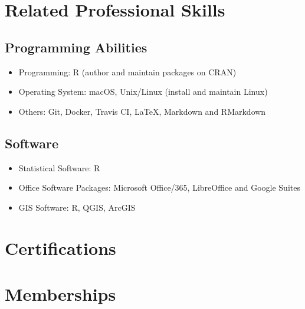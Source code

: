 \documentclass[11pt, a4paper]{awesome-cv}
\providecommand{\tightlist}{%
	\setlength{\itemsep}{0pt}\setlength{\parskip}{0pt}}
\begin{document}
\hypertarget{related-professional-skills}{%
\section{Related Professional
Skills}\label{related-professional-skills}}

\hypertarget{programming-abilities}{%
\subsection{Programming Abilities}\label{programming-abilities}}

\begin{itemize}
\tightlist
\item
  Programming: R (author and maintain packages on CRAN)
\item
  Operating System: macOS, Unix/Linux (install and maintain Linux)
\item
  Others: Git, Docker, Travis CI, LaTeX, Markdown and RMarkdown
\end{itemize}

\hypertarget{software}{%
\subsection{Software}\label{software}}

\begin{itemize}
\tightlist
\item
  Statistical Software: R
\item
  Office Software Packages: Microsoft Office/365, LibreOffice and Google
  Suites
\item
  GIS Software: R, QGIS, ArcGIS
\end{itemize}

\hypertarget{certifications}{%
\section{Certifications}\label{certifications}}

\begin{cventries}
\end{cventries}

\hypertarget{memberships}{%
\section{Memberships}\label{memberships}}
\end{document}
